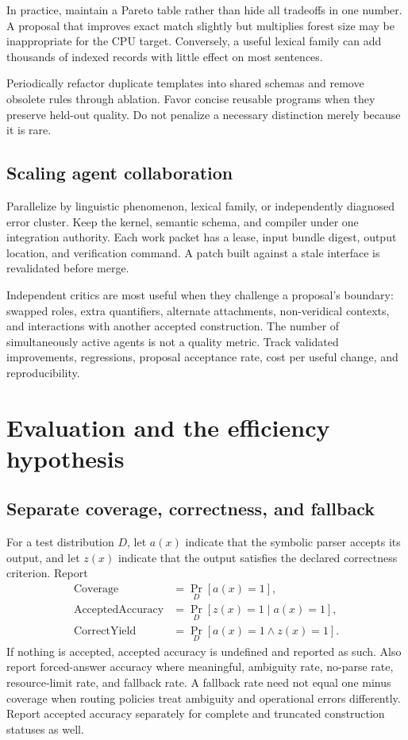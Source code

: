 \documentclass[11pt,a4paper]{article}
\begin{document}
In practice, maintain a Pareto table rather than hide all tradeoffs in one
number. A proposal that improves exact match slightly but multiplies forest
size may be inappropriate for the CPU target. Conversely, a useful lexical
family can add thousands of indexed records with little effect on most
sentences.

Periodically refactor duplicate templates into shared schemas and remove
obsolete rules through ablation. Favor concise reusable programs when they
preserve held-out quality. Do not penalize a necessary distinction merely
because it is rare.

\subsection{Scaling agent collaboration}
Parallelize by linguistic phenomenon, lexical family, or independently
diagnosed error cluster. Keep the kernel, semantic schema, and compiler under
one integration authority. Each work packet has a lease, input bundle digest,
output location, and verification command. A patch built against a stale
interface is revalidated before merge.

Independent critics are most useful when they challenge a proposal's
boundary: swapped roles, extra quantifiers, alternate attachments,
non-veridical contexts, and interactions with another accepted construction.
The number of simultaneously active agents is not a quality metric.
Track validated improvements, regressions, proposal acceptance rate,
cost per useful change, and reproducibility.

\section{Evaluation and the efficiency hypothesis}\label{sec:evaluation}

\subsection{Separate coverage, correctness, and fallback}
For a test distribution \(D\), let \(a(x)\) indicate that the symbolic parser
accepts its output, and let \(z(x)\) indicate that the output satisfies the
declared correctness criterion. Report
\begin{align}
 \mathrm{Coverage}&=\Pr_D[a(x)=1],\\
 \mathrm{AcceptedAccuracy}
   &=\Pr_D[z(x)=1\mid a(x)=1],\\
 \mathrm{CorrectYield}&=\Pr_D[a(x)=1\land z(x)=1].
\end{align}
If nothing is accepted, accepted accuracy is undefined and reported as such.
Also report forced-answer accuracy where meaningful, ambiguity rate,
no-parse rate, resource-limit rate, and fallback rate. A fallback rate need
not equal one minus coverage when routing policies treat ambiguity and
operational errors differently. Report accepted accuracy separately for
complete and truncated construction statuses as well.
\end{document}
